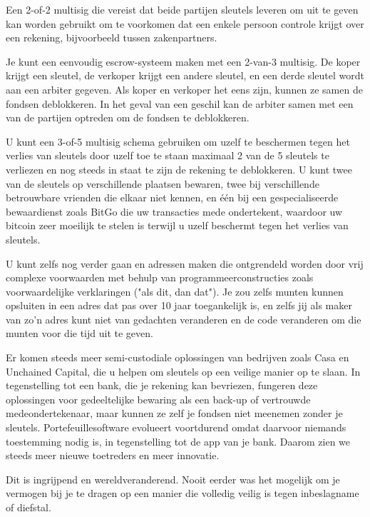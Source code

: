 \documentclass[
  letterpaper,
]{scrbook}
\begin{document}
Een 2-of-2 multisig die vereist dat beide partijen sleutels leveren om
uit te geven kan worden gebruikt om te voorkomen dat een enkele persoon
controle krijgt over een rekening, bijvoorbeeld tussen zakenpartners.

Je kunt een eenvoudig escrow-systeem maken met een 2-van-3 multisig. De
koper krijgt een sleutel, de verkoper krijgt een andere sleutel, en een
derde sleutel wordt aan een arbiter gegeven. Als koper en verkoper het
eens zijn, kunnen ze samen de fondsen deblokkeren. In het geval van een
geschil kan de arbiter samen met een van de partijen optreden om de
fondsen te deblokkeren.

U kunt een 3-of-5 multisig schema gebruiken om uzelf te beschermen tegen
het verlies van sleutels door uzelf toe te staan maximaal 2 van de 5
sleutels te verliezen en nog steeds in staat te zijn de rekening te
deblokkeren. U kunt twee van de sleutels op verschillende plaatsen
bewaren, twee bij verschillende betrouwbare vrienden die elkaar niet
kennen, en één bij een gespecialiseerde bewaardienst zoals BitGo die uw
transacties mede ondertekent, waardoor uw bitcoin zeer moeilijk te
stelen is terwijl u uzelf beschermt tegen het verlies van sleutels.

U kunt zelfs nog verder gaan en adressen maken die ontgrendeld worden
door vrij complexe voorwaarden met behulp van programmeerconstructies
zoals voorwaardelijke verklaringen ("als dit, dan dat"). Je zou zelfs
munten kunnen opsluiten in een adres dat pas over 10 jaar toegankelijk
is, en zelfs jij als maker van zo'n adres kunt niet van gedachten
veranderen en de code veranderen om die munten voor die tijd uit te
geven.

Er komen steeds meer semi-custodiale oplossingen van bedrijven zoals
Casa en Unchained Capital, die u helpen om sleutels op een veilige
manier op te slaan. In tegenstelling tot een bank, die je rekening kan
bevriezen, fungeren deze oplossingen voor gedeeltelijke bewaring als een
back-up of vertrouwde medeondertekenaar, maar kunnen ze zelf je fondsen
niet meenemen zonder je sleutels. Portefeuillesoftware evolueert
voortdurend omdat daarvoor niemands toestemming nodig is, in
tegenstelling tot de app van je bank. Daarom zien we steeds meer nieuwe
toetreders en meer innovatie.

Dit is ingrijpend en wereldveranderend. Nooit eerder was het mogelijk om
je vermogen bij je te dragen op een manier die volledig veilig is tegen
inbeslagname of diefstal.

\end{document}
